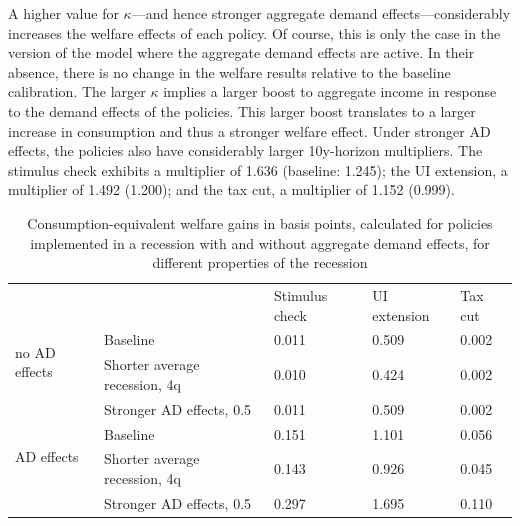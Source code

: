 \documentclass[\econtexRoot/HAFiscal]{subfiles}
\begin{document}
A higher value for $\kappa$---and hence stronger aggregate demand effects---considerably increases the welfare effects of each policy.
Of course, this is only the case in the version of the model where the aggregate demand effects are active.
In their absence, there is no change in the welfare results relative to the baseline calibration.
The larger $\kappa$ implies a larger boost to aggregate income in response to the demand effects of the policies.
This larger boost translates to a larger increase in consumption and thus a stronger welfare effect.
Under stronger AD effects, the policies also have considerably larger 10y-horizon multipliers.
The stimulus check exhibits a multiplier of 1.636 (baseline: 1.245); the UI extension, a multiplier of 1.492 (1.200); and the tax cut, a multiplier of 1.152 (0.999).


\begin{table}[]
  \begin{center}
    \begin{tabular}{@{}lllll@{}}
      \toprule
      &                    											& Stimulus check & UI extension & Tax cut 	\\ \cmidrule(l){1-5}
      \multirow{2}{*}{no AD effects} 					& Baseline 						& 0.011          & 0.509        & 0.002   	\\ 
      & Shorter average recession, 4q & 0.010          & 0.424        & 0.002  	\\
      & Stronger AD effects, 0.5 		& 0.011          & 0.509        & 0.002   	\\ \cmidrule(l){1-5}
      \multirow{2}{*}{AD effects}						& Baseline    					& 0.151          & 1.101        & 0.056   	\\
      & Shorter average recession, 4q & 0.143          & 0.926        & 0.045   	\\
      & Stronger AD effects, 0.5    	& 0.297          & 1.695        & 0.110   	\\ \cmidrule(l){1-5} 
    \end{tabular}
    \caption{Consumption-equivalent welfare gains in basis points, calculated for policies implemented in a recession with and without aggregate demand effects, for different properties of the recession}
    \notinsubfile{\label{tab:robustness_recession_property_results}}
  \end{center}
\end{table}
\end{document}
